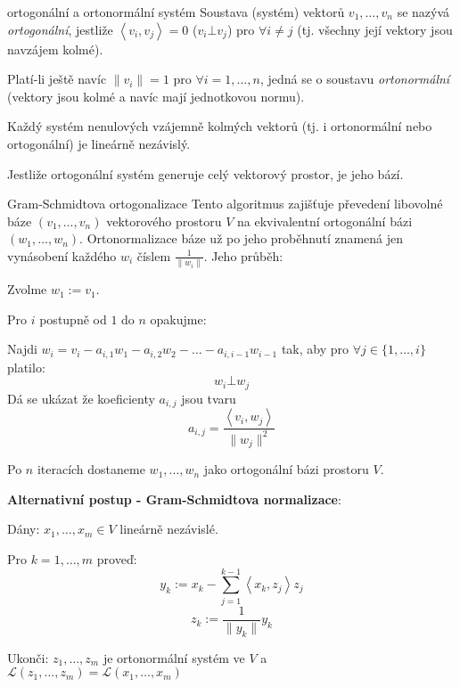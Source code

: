 \begin{definiceN}{ortogonální a ortonormální systém}
Soustava (systém) vektorů $v_1, \dots, v_n$ se nazývá \emph{ortogonální}, jestliže $\left<v_i,v_j\right> = 0$ ($v_i \bot v_j$) pro $\forall i \neq j$ (tj. všechny její vektory jsou navzájem kolmé). 

\noindent
Platí-li ještě navíc $\|v_i\|=1$ pro $\forall i=1,\dots,n$, jedná se o soustavu \emph{ortonormální} (vektory jsou kolmé a navíc mají jednotkovou normu).
\end{definiceN}

\begin{pozorovani}
Každý systém nenulových vzájemně kolmých vektorů (tj. i ortonormální nebo ortogonální) je lineárně nezávislý.
\end{pozorovani}

\begin{dusledek}
Jestliže ortogonální systém generuje celý vektorový prostor, je jeho bází.
\end{dusledek}

\begin{algoritmusN}{Gram-Schmidtova ortogonalizace}
Tento algoritmus zajišťuje převedení libovolné báze $(v_1,\dots,v_n)$ vektorového prostoru $V$ na ekvivalentní ortogonální bázi $(w_1,\dots,w_n)$. Ortonormalizace báze už po jeho proběhnutí znamená jen vynásobení každého $w_i$ číslem $\frac{1}{\|w_i\|}$. Jeho průběh:
\begin{penumerate}
    \item Zvolme $w_1 := v_1$.
    \item Pro $i$ postupně od $1$ do $n$ opakujme:
\par\noindent
    Najdi $w_i=v_i-a_{i,1}w_1 - a_{i,2}w_2 - \dots - a_{i,i-1}w_{i-1}$ tak, aby pro $\forall j\in\{1,\dots,i\}$ platilo:
    $$w_i\bot w_j$$
    Dá se ukázat že koeficienty $a_{i,j}$ jsou tvaru
    $$a_{i,j}=\frac{\left<v_i,w_j\right>}{\|w_j\|^2}$$
    \item Po $n$ iteracích dostaneme $w_1,\dots,w_n$ jako ortogonální bázi prostoru $V$.
\end{penumerate}

\textbf{Alternativní postup - Gram-Schmidtova normalizace}:
\begin{penumerate}
	\item Dány: $x_1,\dots,x_m \in V$ lineárně nezávislé.
	\item Pro $k=1,\dots,m$ proveď:
		$$y_k := x_k - \sum_{j=1}^{k-1} \left<x_k,z_j\right>z_j$$
		$$z_k := \frac{1}{\|y_k\|}y_k$$
	\item Ukonči: $z_1,\dots,z_m$ je ortonormální systém ve $V$ a\\$\mathcal{L}(z_1,\dots,z_m) = \mathcal{L}(x_1,\dots,x_m)$
\end{penumerate}
\end{algoritmusN}

